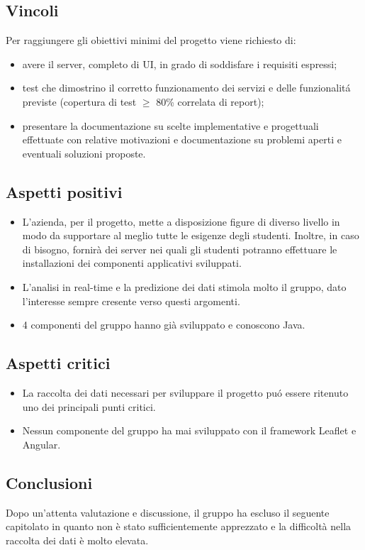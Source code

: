 \subsection{Vincoli}
Per raggiungere gli obiettivi minimi del progetto viene richiesto di:
\begin{itemize}
	\item avere il server, completo di UI, in grado di soddisfare i requisiti espressi;
	\item test che dimostrino il corretto funzionamento dei servizi e delle funzionalit\'a previste (copertura di test $\geq$ 80\% correlata di report);
	\item presentare la documentazione su scelte implementative e progettuali effettuate con relative motivazioni e documentazione su problemi aperti e eventuali soluzioni proposte.
\end{itemize}

\subsection{Aspetti positivi}
\begin{itemize}
	\item L'azienda, per il progetto, mette a disposizione figure di diverso livello in modo da supportare al meglio tutte le esigenze degli studenti. Inoltre, in caso di bisogno, fornirà dei server nei quali gli studenti potranno effettuare le installazioni dei componenti applicativi sviluppati.
	\item L'analisi in real-time e la predizione dei dati stimola molto il gruppo, dato l'interesse sempre cresente verso questi argomenti. 
	\item 4 componenti del gruppo hanno già sviluppato e conoscono Java.
\end{itemize}

\subsection{Aspetti critici}
\begin{itemize}
	\item La raccolta dei dati necessari per sviluppare il progetto pu\'o essere ritenuto uno dei principali punti critici.
	\item Nessun componente del gruppo ha mai sviluppato con il framework Leaflet e Angular.
\end{itemize}

\subsection{Conclusioni}
Dopo un'attenta valutazione e discussione, il gruppo ha escluso il seguente capitolato in quanto non è stato sufficientemente apprezzato e la difficoltà nella raccolta dei dati è molto elevata.